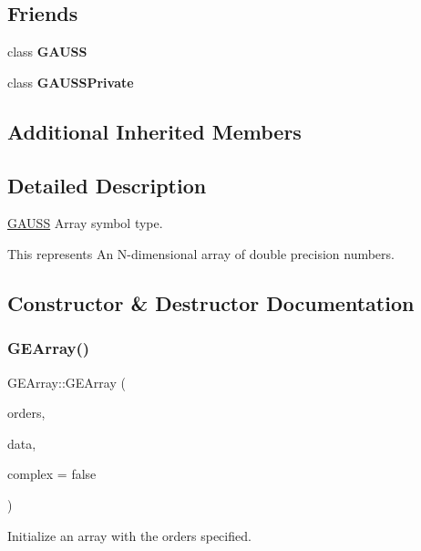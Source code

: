 \subsection*{Friends}
\begin{DoxyCompactItemize}
\item 
\mbox{\label{class_g_e_array_abc89e64d0ec6c939575c3125753c6309}} 
class {\bfseries G\+A\+U\+SS}
\item 
\mbox{\label{class_g_e_array_a2e5e14117f0e69078f45b8d512f056de}} 
class {\bfseries G\+A\+U\+S\+S\+Private}
\end{DoxyCompactItemize}
\subsection*{Additional Inherited Members}


\subsection{Detailed Description}
\hyperlink{class_g_a_u_s_s}{G\+A\+U\+SS} Array symbol type. 

This represents An N-\/dimensional array of double precision numbers. 

\subsection{Constructor \& Destructor Documentation}
\mbox{\label{class_g_e_array_a99e59c84b9ee6288030cda2fecc116af}} 
\subsubsection{\texorpdfstring{G\+E\+Array()}{GEArray()}}
{\footnotesize\ttfamily G\+E\+Array\+::\+G\+E\+Array (\begin{DoxyParamCaption}\item[{vector$<$ int $>$}]{orders,  }\item[{V\+E\+C\+T\+O\+R\+\_\+\+D\+A\+TA(double)}]{data,  }\item[{bool}]{complex = {\ttfamily false} }\end{DoxyParamCaption})}



Initialize an array with the orders specified. 

